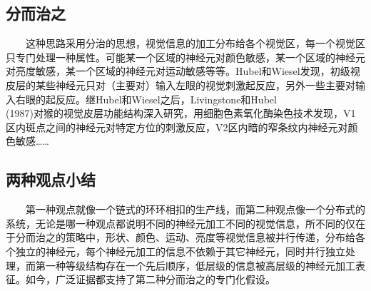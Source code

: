 \documentclass{article}
\begin{document}
\begin{spacing}{1.0}
\subsection{分而治之}
\ \ \ \ 这种思路采用分治的思想，视觉信息的加工分布给各个视觉区，每一个视觉区只专门处理一种属性。可能某一个区域的神经元对颜色敏感，某一个区域的神经元对亮度敏感，某一个区域的神经元对运动敏感等等。Hubel和Wiesel发现，初级视皮层的某些神经元只对（主要对）输入左眼的视觉刺激起反应，另外一些主要对输入右眼的起反应。继Hubel和Wiesel之后，Livingstone和Hubel\\(1987)对猴的视觉皮层功能结构深入研究，用细胞色素氧化酶染色技术发现，V1区内斑点之间的神经元对特定方位的刺激反应，V2区内暗的窄条纹内神经元对颜色敏感\cite{sjkxyl}……\par 
\subsection{两种观点小结}
\ \ \ \ 第一种观点就像一个链式的环环相扣的生产线，而第二种观点像一个分布式的系统，无论是哪一种观点都说明不同的神经元加工不同的视觉信息，所不同的仅在于分而治之的策略中，形状、颜色、运动、亮度等视觉信息被并行传递，分布给各个独立的神经元，每个神经元加工的信息不依赖于其它神经元，同时并行独立处理，而第一种等级结构存在一个先后顺序，低层级的信息被高层级的神经元加工表征。如今，广泛证据都支持了第二种分而治之的专门化假设。

\end{spacing}
\end{document}

